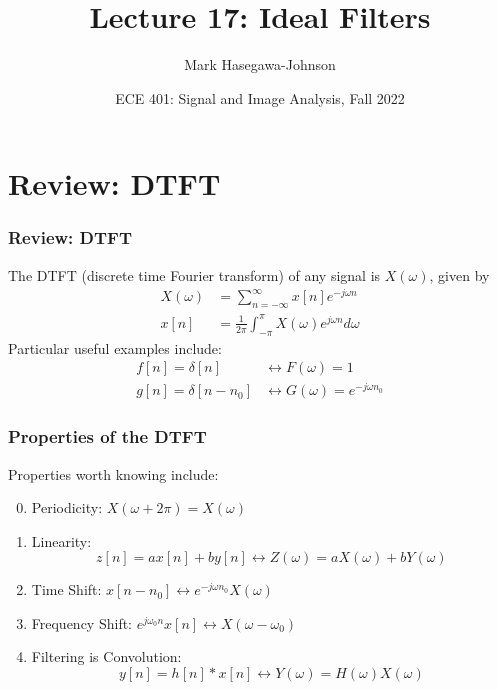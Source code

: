 \documentclass{beamer}
\title{Lecture 17: Ideal Filters}
\author{Mark Hasegawa-Johnson}
\date{ECE 401: Signal and Image Analysis, Fall 2022}
\begin{document}
\begin{frame}
  \maketitle
\end{frame}

\begin{frame}
  \tableofcontents
\end{frame}

\section[DTFT]{Review: DTFT}
\setcounter{subsection}{1}

\begin{frame}
  \frametitle{Review: DTFT}

  The DTFT (discrete time Fourier transform) of any signal is
  $X(\omega)$, given by
  \begin{align*}
    X(\omega) &= \sum_{n=-\infty}^\infty x[n]e^{-j\omega n}\\
    x[n] &= \frac{1}{2\pi}\int_{-\pi}^\pi X(\omega)e^{j\omega n}d\omega
  \end{align*}
  Particular useful examples include:
  \begin{align*}
    f[n]=\delta[n] &\leftrightarrow F(\omega)=1\\
    g[n]=\delta[n-n_0] &\leftrightarrow G(\omega)=e^{-j\omega n_0}
  \end{align*}
\end{frame}

\begin{frame}
  \frametitle{Properties of the DTFT}

  Properties worth knowing  include:
  \begin{enumerate}
    \setcounter{enumi}{-1}
  \item Periodicity: $X(\omega+2\pi)=X(\omega)$
  \item Linearity:
    \[z[n]=ax[n]+by[n]\leftrightarrow Z(\omega)=aX(\omega)+bY(\omega)
    \]
  \item Time Shift: $x[n-n_0]\leftrightarrow e^{-j\omega n_0}X(\omega)$
  \item Frequency Shift: $e^{j\omega_0 n}x[n]\leftrightarrow X(\omega-\omega_0)$
  \item Filtering is Convolution:
    \[
    y[n]=h[n]\ast x[n]\leftrightarrow Y(\omega)=H(\omega)X(\omega)
    \]
  \end{enumerate}
\end{frame}
\end{document}
